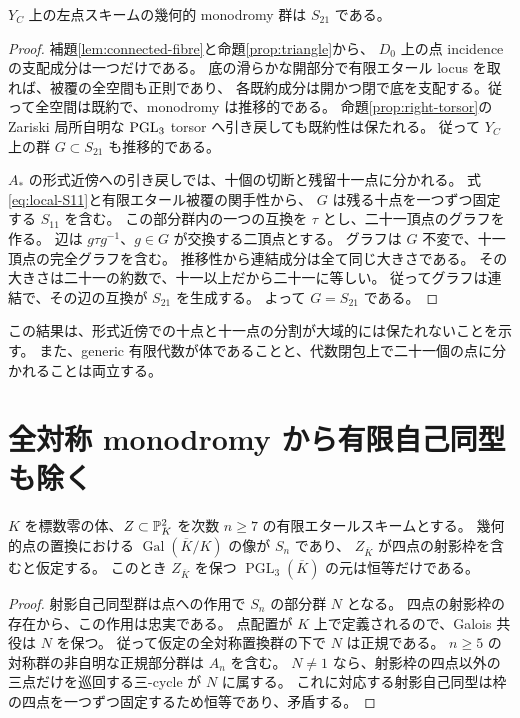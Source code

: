 \begin{theorem}\label{thm:S21}
$Y_C$ 上の左点スキームの幾何的 monodromy 群は $S_{21}$ である。
\end{theorem}
\begin{proof}
補題\ref{lem:connected-fibre}と命題\ref{prop:triangle}から、
$D_0$ 上の点 incidence の支配成分は一つだけである。
底の滑らかな開部分で有限エタール locus を取れば、被覆の全空間も正則であり、
各既約成分は開かつ閉で底を支配する。従って全空間は既約で、monodromy は推移的である。
命題\ref{prop:right-torsor}の Zariski 局所自明な $\operatorname{PGL}_3$ torsor へ引き戻しても既約性は保たれる。
従って $Y_C$ 上の群 $G\subset S_{21}$ も推移的である。

$A_*$ の形式近傍への引き戻しでは、十個の切断と残留十一点に分かれる。
式\eqref{eq:local-S11}と有限エタール被覆の関手性から、
$G$ は残る十点を一つずつ固定する $S_{11}$ を含む。
この部分群内の一つの互換を $\tau$ とし、二十一頂点のグラフを作る。
辺は $g\tau g^{-1}$、$g\in G$ が交換する二頂点とする。
グラフは $G$ 不変で、十一頂点の完全グラフを含む。
推移性から連結成分は全て同じ大きさである。
その大きさは二十一の約数で、十一以上だから二十一に等しい。
従ってグラフは連結で、その辺の互換が $S_{21}$ を生成する。
よって $G=S_{21}$ である。
\end{proof}

この結果は、形式近傍での十点と十一点の分割が大域的には保たれないことを示す。
また、generic 有限代数が体であることと、代数閉包上で二十一個の点に分かれることは両立する。

\section{全対称 monodromy から有限自己同型も除く}

\begin{lemma}
\label{lem:symmetric-monodromy-no-projective-aut-v23}
$K$ を標数零の体、$Z\subset\mathbb P^2_K$ を次数 $n\ge7$ の有限エタールスキームとする。
幾何的点の置換における $\operatorname{Gal}(\overline K/K)$ の像が $S_n$ であり、
$Z_{\overline K}$ が四点の射影枠を含むと仮定する。
このとき $Z_{\overline K}$ を保つ $\operatorname{PGL}_3(\overline K)$ の元は恒等だけである。
\end{lemma}
\begin{proof}
射影自己同型群は点への作用で $S_n$ の部分群 $N$ となる。
四点の射影枠の存在から、この作用は忠実である。
点配置が $K$ 上で定義されるので、Galois 共役は $N$ を保つ。
従って仮定の全対称置換群の下で $N$ は正規である。
$n\ge5$ の対称群の非自明な正規部分群は $A_n$ を含む。
$N\ne1$ なら、射影枠の四点以外の三点だけを巡回する三-cycle が $N$ に属する。
これに対応する射影自己同型は枠の四点を一つずつ固定するため恒等であり、矛盾する。
\end{proof}

